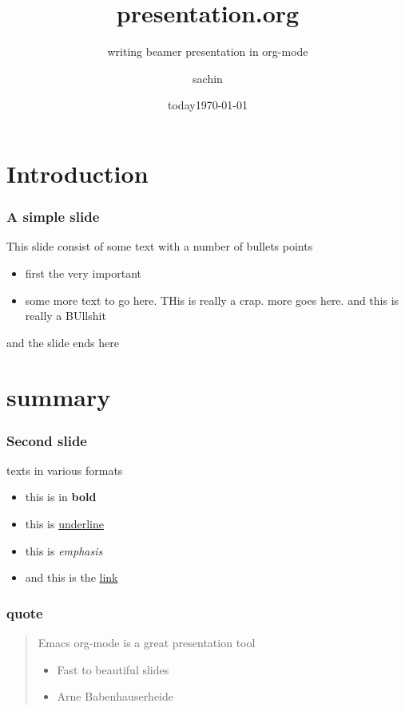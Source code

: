\documentclass[bigger, presentation]{beamer}
\date{today}
\subtitle{writing beamer presentation in org-mode}
\institute{Indian Institute of Technology, Bombay}
\title{presentation.org}
\author{sachin}
\date{\today}
\begin{document}
\maketitle

\section{Introduction}
\label{sec-1}
\begin{frame}
\frametitle{A simple slide}
\label{sec-1-1}

This slide consist of some text with a number of bullets points

\begin{itemize}
\item first the very important
\item some more text to go here. THis is really a crap. more goes
  here. and this is really a BUllshit
\end{itemize}

and the slide ends here
\end{frame}
\section{summary}
\label{sec-2}

  
\begin{frame}
\frametitle{Second slide}
\label{sec-2-1}

   texts in various formats

\begin{itemize}
\item this is in \textbf{bold}
\item this is \underline{underline}
\item this is \emph{emphasis}
\item and this is the \hyperref[www.google.ru]{link}
\end{itemize}
\end{frame}
\begin{frame}
\frametitle{quote}
\label{sec-2-2}

\begin{quote}
Emacs org-mode is a 
great presentation tool 
\begin{itemize}
\item Fast to beautiful slides
\item Arne Babenhauserheide
\end{itemize}

\end{quote}

     
\end{frame}
\end{document}
